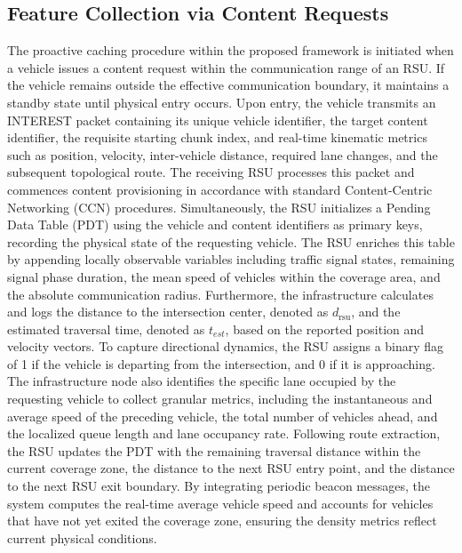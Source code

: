 \documentclass[journal]{IEEEtran}
\begin{document}
\subsection{Feature Collection via Content Requests} \label{sec.prop.A}
The proactive caching procedure within the proposed framework is initiated when a vehicle issues a content request within the communication range of an RSU.
If the vehicle remains outside the effective communication boundary, it maintains a standby state until physical entry occurs.
Upon entry, the vehicle transmits an INTEREST packet containing its unique vehicle identifier, the target content identifier, the requisite starting chunk index, and real-time kinematic metrics such as position, velocity, inter-vehicle distance, required lane changes, and the subsequent topological route.
The receiving RSU processes this packet and commences content provisioning in accordance with standard Content-Centric Networking (CCN) procedures.
Simultaneously, the RSU initializes a Pending Data Table (PDT) using the vehicle and content identifiers as primary keys, recording the physical state of the requesting vehicle.
The RSU enriches this table by appending locally observable variables including traffic signal states, remaining signal phase duration, the mean speed of vehicles within the coverage area, and the absolute communication radius.
Furthermore, the infrastructure calculates and logs the distance to the intersection center, denoted as $d_{\text{rsu}}$, and the estimated traversal time, denoted as $t_{est}$, based on the reported position and velocity vectors.
To capture directional dynamics, the RSU assigns a binary flag of 1 if the vehicle is departing from the intersection, and 0 if it is approaching.
The infrastructure node also identifies the specific lane occupied by the requesting vehicle to collect granular metrics, including the instantaneous and average speed of the preceding vehicle, the total number of vehicles ahead, and the localized queue length and lane occupancy rate.
Following route extraction, the RSU updates the PDT with the remaining traversal distance within the current coverage zone, the distance to the next RSU entry point, and the distance to the next RSU exit boundary.
By integrating periodic beacon messages, the system computes the real-time average vehicle speed and accounts for vehicles that have not yet exited the coverage zone, ensuring the density metrics reflect current physical conditions.
\end{document}
